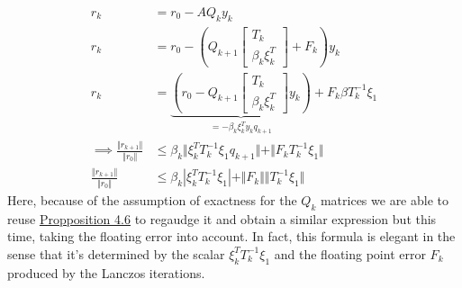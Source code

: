 \documentclass[]{article}
\theoremstyle{definition}
\begin{document}
            \begin{align}
                r_k &= r_0 - AQ_ky_k
                \\
                r_k &= r_0 - 
                    \left(
                        Q_{k + 1} \begin{bmatrix}
                            T_k
                            \\
                            \beta_k \xi_k^T
                        \end{bmatrix}
                        + 
                        F_k
                    \right)
                y_k
                \\
                r_k &= 
                \underbrace{\left(
                    r_0 - Q_{k + 1}\begin{bmatrix}
                        T_k
                        \\
                        \beta_k \xi_k^T
                    \end{bmatrix}y_k
                \right)}_{= -\beta_k\xi_k^Ty_kq_{k + 1}} + F_k \beta T_k^{-1}\xi_1
                \\
                \implies
                \frac{\Vert r_{k + 1}\Vert}
                {
                    \Vert r_0\Vert
                } &\le
                \beta_k \Vert
                    \xi_k^T T_k^{-1}\xi_1 q_{k + 1}
                \Vert + 
                \Vert F_kT_k^{-1}\xi_1 \Vert
                \\
                \frac{\Vert r_{k + 1}\Vert}
                {
                    \Vert r_0\Vert
                } 
                &\le 
                \beta_k |
                    \xi_k^T T_k^{-1}\xi_1
                | + 
                \Vert F_k\Vert  \Vert T_k^{-1}\xi_1\Vert
            \end{align}
            Here, because of the assumption of exactness for the $Q_k$ matrices we are able to reuse \hyperref[prop:Lanczos_Vectors_and_Residuals]{Propposition 4.6} to regaudge it and obtain a similar expression but this time, taking the floating error into account. In fact, this formula is elegant in the sense that it's determined by the scalar $\xi_k^T T_k^{-1}\xi_1$ and the floating point error $F_k$ produced by the Lanczos iterations. 
\end{document}
